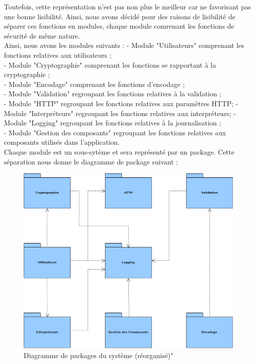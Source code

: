Toutefois, cette représentation n'est pas non plus le meilleur car ne favorisant pas une bonne lisibilité. Ainsi, nous avons décidé pour des raisons de lisibilité de séparer ces fonctions en modules, chaque module comrenant les fonctions de sécurité de même nature.\\
Ainsi, nous avons les modules suivants :
- Module "Utilisateurs" comprenant les fonctions relatives aux utilisateurs ;\\
- Module "Cryptographie" comprenant les fonctions se rapportant à la cryptographie ; \\
- Module "Encodage" comprenant les fonctions d'encodage ; \\ 
- Module "Validation" regroupant les fonctions relatives à la validation ; \\
- Module "HTTP" regroupant les fonctions relatives aux paramètres HTTP;
- Module "Interpréteurs" regroupant les fonctions relatives aux interpréteurs;
- Module "Logging" regroupant les fonctions relatives à la journalisation ; \\
- Module "Gestion des composants" regroupant les fonctions relatives aux composants utilisés dans l'application.\\
Chaque module est un sous-sytème et sera représenté par un package. Cette séparation nous donne le diagramme de package suivant :
\begin{figure}[H]
	\centering
	\includegraphics[height=0.5\textheight]{fig/S-Package-diagram.png}
	\caption{Diagramme de packages du système (réorganisé)"}
\end{figure}


